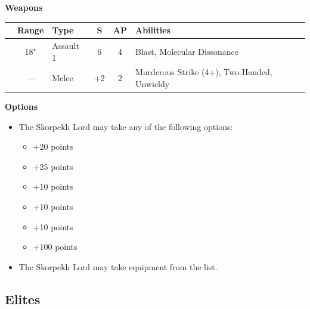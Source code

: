 \begin{minipage}[t]{0.72\textwidth}
	\vspace*{2em}
	\textbf{Weapons}
	
	\begin{tabular}{L{90 pt} c C{40pt} *{2}{c} >{\raggedright\arraybackslash}p{130pt}}
		& Range & Type & S & AP & Abilities \\
		\hline
		 & 18" & Assault 1 & 6 & 4 & Blast, Molecular Dissonance \\
		 & — & Melee & +2 & 2 & Murderous Strike (4+), Two-Handed, Unwieldy \\
	\end{tabular}
	
	\vspace*{2em}
	\textbf{Options}
	\begin{itemize}
		\item The Skorpekh Lord may take any of the following options:
		\begin{itemize}
			\item {} \dotfill +20 points
			\item {} \dotfill +25 points
			\item {} \dotfill +10 points
			\item {} \dotfill +10 points
			\item {} \dotfill +10 points
			\item {} \dotfill +100 points
		\end{itemize}
		\item The Skorpekh Lord may take equipment from the  list.
	\end{itemize}
\end{minipage}
\hspace{0.5em}


\newpage
\subsection{Elites}

\newpage

